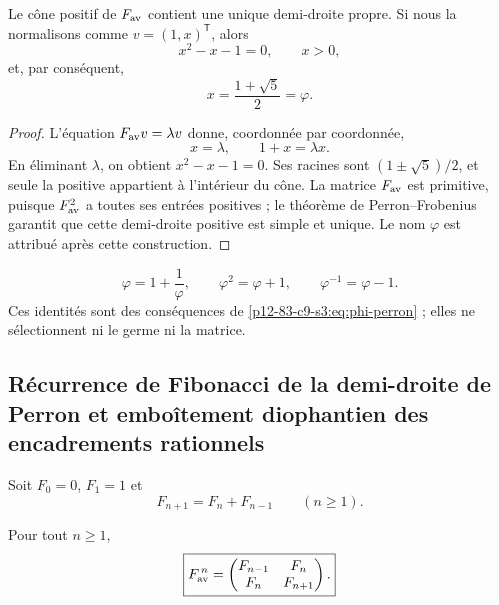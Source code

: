 \begin{theorem}
\label{p12-83-c9-s3:thm:rayo-perron-phi}
Le cône positif de \(F_{\rm av}\) contient une unique demi-droite propre. Si nous la
normalisons comme \(v=(1,x)^{\mathsf T}\), alors
\[
 x^2-x-1=0,
 \qquad
 x>0,
\]
et, par conséquent,
\begin{equation}
 \boxed{x=\frac{1+\sqrt5}{2}=\varphi.}
 \label{p12-83-c9-s3:eq:phi-perron}
\end{equation}
\end{theorem}

\begin{proof}
L’équation \(F_{\rm av}v=\lambda v\) donne, coordonnée par coordonnée,
\[
 x=\lambda,
 \qquad
 1+x=\lambda x.
\]
En éliminant \(\lambda\), on obtient \(x^2-x-1=0\). Ses racines sont
\((1\pm\sqrt5)/2\), et seule la positive appartient à l’intérieur du cône. La
matrice \(F_{\rm av}\) est primitive, puisque \(F_{\rm av}^2\) a toutes ses
entrées positives ; le théorème de Perron--Frobenius garantit que cette demi-droite
positive est simple et unique. Le nom \(\varphi\) est attribué après cette
construction.
\end{proof}

\begin{corollary}
\[
 \varphi=1+\frac1\varphi,
 \qquad
 \varphi^2=\varphi+1,
 \qquad
 \varphi^{-1}=\varphi-1.
\]
Ces identités sont des conséquences de \eqref{p12-83-c9-s3:eq:phi-perron} ; elles ne sélectionnent
ni le germe ni la matrice.
\end{corollary}

\subsection{Récurrence de Fibonacci de la demi-droite de Perron et emboîtement diophantien des encadrements rationnels}

Soit \(F_0=0\), \(F_1=1\) et
\[
 F_{n+1}=F_n+F_{n-1}\qquad(n\geq1).
\]

\begin{theorem}
\label{p12-83-c9-s3:thm:potencias-fibonacci-phi}
Pour tout \(n\geq1\),
\begin{equation}
 \boxed{
 F_{\rm av}^{\,n}=
 \begin{pmatrix}
 F_{n-1}&F_n\\
 F_n&F_{n+1}
 \end{pmatrix}.}
 \label{p12-83-c9-s3:eq:potencias-Fav-fibonacci}
\end{equation}
\end{theorem}

